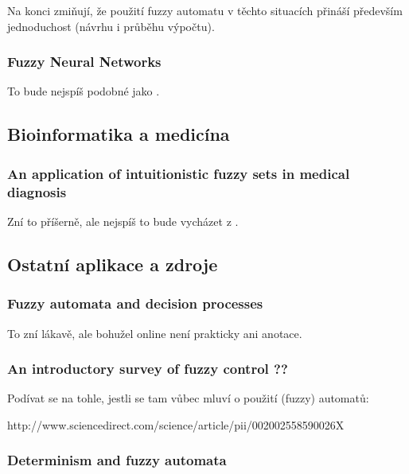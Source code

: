 \documentclass[a4paper,10pt]{article}
\begin{document}
Na konci zmiňují, že použití fuzzy automatu v těchto situacích přináší především jednoduchost (návrhu i průběhu výpočtu).


\subsubsection*{Fuzzy Neural Networks \cite{LeeLee-FuzzNeuNet}}

To bude nejspíš podobné jako \cite{DarAhmSin-AppFuzzAutTheKnBsNeuNetDevBasLeaMod}. 


\subsection{Bioinformatika a medicína}




\subsubsection*{An application of intuitionistic fuzzy sets in medical diagnosis \cite{SupBisAkh-AppIntFuzzSetMedDiag}}

Zní to příšerně, ale nejspíš to bude vycházet z \cite{GupSar-FuzzAutDecProc}.


\subsection{Ostatní aplikace a zdroje}

\subsubsection*{Fuzzy automata and decision processes\cite{GupSar-FuzzAutDecProc}}

To zní lákavě, ale bohužel online není prakticky ani anotace.


\subsubsection*{An introductory survey of fuzzy control ??}

Podívat se na tohle, jestli se tam vůbec mluví o použití (fuzzy) automatů:

http://www.sciencedirect.com/science/article/pii/002002558590026X


\subsubsection*{Determinism and fuzzy automata \cite{Bel-DetFuzzAut}}
\end{document}
